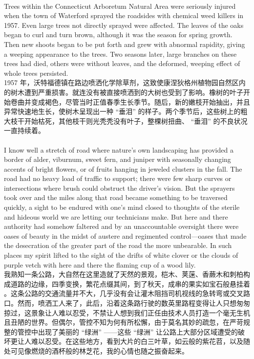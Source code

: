 \documentclass{article}
\begin{document}
\\
Trees within the Connecticut Arboretum Natural Area were seriously injured when the town of Waterford sprayed the roadsides with chemical weed killers in 1957. Even large trees not directly sprayed were affected. The leaves of the oaks began to curl and turn brown, although it was the season for spring growth. Then new shoots began to be put forth and grew with abnormal rapidity, giving a weeping appearance to the trees. Two seasons later, large branches on these trees had died, others were without leaves, and the deformed, weeping effect of whole trees persisted.\\
1957 年，沃特福德镇在路边喷洒化学除草剂，这致使康涅狄格州植物园自然区内的树木遭到严重损害。就连没有被直接喷洒到的大树也受到了影响。橡树的叶子开始卷曲并变成褐色，尽管当时正值春季生长季节。随后，新的嫩枝开始抽出，并且异常快速地生长，使树木呈现出一种 “垂泪” 的样子。两个季节后，这些树上的粗大枝干开始枯死，其他枝干则光秃秃没有叶子，整棵树扭曲、 “垂泪” 的不良状况一直持续着。 \\

\\
I know well a stretch of road where nature’s own landscaping has provided a border of alder, viburnum, sweet fern, and juniper with seasonally changing accents of bright flowers, or of fruits hanging in jeweled clusters in the fall. The road had no heavy load of traffic to support; there were few sharp curves or intersections where brush could obstruct the driver’s vision. But the sprayers took over and the miles along that road became something to be traversed quickly, a sight to be endured with one’s mind closed to thoughts of the sterile and hideous world we are letting our technicians make. But here and there authority had somehow faltered and by an unaccountable oversight there were oases of beauty in the midst of austere and regimented control—oases that made the desecration of the greater part of the road the more unbearable. In such places my spirit lifted to the sight of the drifts of white clover or the clouds of purple vetch with here and there the flaming cup of a wood lily.\\
我熟知一条公路，大自然在这里造就了天然的景观，桤木、荚蒾、香蕨木和刺柏构成道路的边缘，四季变换，繁花点缀其间，到了秋天，成串的果实如宝石般悬挂着 。这条公路的交通流量并不大，几乎没有会让灌木阻挡司机视线的急转弯或交叉路口。然而，喷洒工人来了，此后，沿着这条路行驶的数英里路程变得让人只想匆匆掠过，这景象让人难以忍受，不禁让人想到我们正任由技术人员打造一个毫无生机且丑陋的世界。但偶尔，管控不知为何有所松懈，由于莫名其妙的疏忽，在严苛规整的管控中出现了美丽的 “绿洲” ——这些 “绿洲” 让公路上大部分区域遭受的破坏更让人难以忍受。在这些地方，看到大片的白三叶草，如云般的紫花苕，以及随处可见像燃烧的酒杯般的林芝花，我的心情也随之振奋起来。 \\
\end{document}
